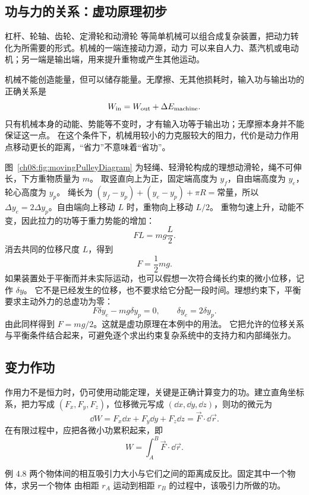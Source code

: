 \subsection{功与力的关系：虚功原理初步}

杠杆、轮轴、齿轮、定滑轮和动滑轮
等简单机械可以组合成复杂装置，把动力转化为所需要的形式。机械的一端连接动力源，动力
可以来自人力、蒸汽机或电动机；另一端是输出端，用来提升重物或产生其他运动。

机械不能创造能量，但可以储存能量。无摩擦、无其他损耗时，输入功与输出功的正确关系是
\[
 W_{\rm in}=W_{\rm out}+\Delta E_{\rm machine}.
\]
只有机械本身的动能、势能等不变时，才有输入功等于输出功；无摩擦本身并不能保证这一点。
在这个条件下，机械用较小的力克服较大的阻力，代价是动力作用点移动更长的距离，“省力”不意味着“省功”。

图~\ref{ch08:fig:movingPulleyDiagram} 为轻绳、轻滑轮构成的理想动滑轮，绳不可伸长，下方重物质量为 $m$。
取竖直向上为正，固定端高度为 $y_f$，自由端高度为 $y_e$，轮心高度为 $y_p$。
绳长为 $(y_f-y_p)+(y_e-y_p)+\pi R=\text{常量}$，所以
$\Delta y_e=2\Delta y_p$。自由端向上移动 $L$ 时，重物向上移动 $L/2$。
重物匀速上升，动能不变，因此拉力的功等于重力势能的增加：
\movingPulleyDiagram
\begin{equation}
 F L=mg\frac{L}{2}.
\end{equation}
消去共同的位移尺度 $L$，得到
\begin{equation}
 F=\frac12mg.
\end{equation}
如果装置处于平衡而并未实际运动，也可以假想一次符合绳长约束的微小位移，记作 $\delta y$。
它不是已经发生的位移，也不要求给它分配一段时间。理想约束下，平衡要求主动外力的总虚功为零：
\[
 F\delta y_e-mg\delta y_p=0,\qquad \delta y_e=2\delta y_p.
\]
由此同样得到 $F=mg/2$。这就是虚功原理在本例中的用法。
它把允许的位移关系与平衡条件结合起来，可避免逐个求出约束复杂系统中的支持力和内部绳张力。

\subsection{变力作功}

作用力不是恒力时，仍可使用动能定理，关键是正确计算变力的功。建立直角坐标系，把力写成
$(F_x,F_y,F_z)$，位移微元写成 $(\dd x,\dd y,\dd z)$，则功的微元为
\begin{equation}
 \dd W=F_x\dd x+F_y\dd y+F_z\dd z=\vec F\cdot\dd\vec r.
\end{equation}
在有限过程中，应把各微小功累积起来，即
\[
 W=\int_A^B\vec F\cdot\dd\vec r.
\]

\begin{origexamplebox}{例 4.8}
两个物体间的相互吸引力大小与它们之间的距离成反比。固定其中一个物体，求另一个物体
由相距 $r_A$ 运动到相距 $r_B$ 的过程中，该吸引力所做的功。
\end{origexamplebox}

